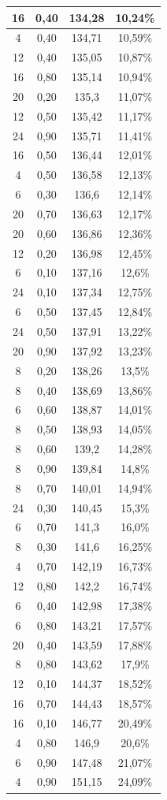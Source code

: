 \begin{center}
\begin{longtable}{|c|c|c|c|}
16 & 0,40 & 134,28 & 10,24\% \\ \hline
4 & 0,40 & 134,71 & 10,59\% \\ \hline
12 & 0,40 & 135,05 & 10,87\% \\ \hline
16 & 0,80 & 135,14 & 10,94\% \\ \hline
20 & 0,20 & 135,3 & 11,07\% \\ \hline
12 & 0,50 & 135,42 & 11,17\% \\ \hline
24 & 0,90 & 135,71 & 11,41\% \\ \hline
16 & 0,50 & 136,44 & 12,01\% \\ \hline
4 & 0,50 & 136,58 & 12,13\% \\ \hline
6 & 0,30 & 136,6 & 12,14\% \\ \hline
20 & 0,70 & 136,63 & 12,17\% \\ \hline
20 & 0,60 & 136,86 & 12,36\% \\ \hline
12 & 0,20 & 136,98 & 12,45\% \\ \hline
6 & 0,10 & 137,16 & 12,6\% \\ \hline
24 & 0,10 & 137,34 & 12,75\% \\ \hline
6 & 0,50 & 137,45 & 12,84\% \\ \hline
24 & 0,50 & 137,91 & 13,22\% \\ \hline
20 & 0,90 & 137,92 & 13,23\% \\ \hline
8 & 0,20 & 138,26 & 13,5\% \\ \hline
8 & 0,40 & 138,69 & 13,86\% \\ \hline
6 & 0,60 & 138,87 & 14,01\% \\ \hline
8 & 0,50 & 138,93 & 14,05\% \\ \hline
8 & 0,60 & 139,2 & 14,28\% \\ \hline
8 & 0,90 & 139,84 & 14,8\% \\ \hline
8 & 0,70 & 140,01 & 14,94\% \\ \hline
24 & 0,30 & 140,45 & 15,3\% \\ \hline
6 & 0,70 & 141,3 & 16,0\% \\ \hline
8 & 0,30 & 141,6 & 16,25\% \\ \hline
4 & 0,70 & 142,19 & 16,73\% \\ \hline
12 & 0,80 & 142,2 & 16,74\% \\ \hline
6 & 0,40 & 142,98 & 17,38\% \\ \hline
6 & 0,80 & 143,21 & 17,57\% \\ \hline
20 & 0,40 & 143,59 & 17,88\% \\ \hline
8 & 0,80 & 143,62 & 17,9\% \\ \hline
12 & 0,10 & 144,37 & 18,52\% \\ \hline
16 & 0,70 & 144,43 & 18,57\% \\ \hline
16 & 0,10 & 146,77 & 20,49\% \\ \hline
4 & 0,80 & 146,9 & 20,6\% \\ \hline
6 & 0,90 & 147,48 & 21,07\% \\ \hline
4 & 0,90 & 151,15 & 24,09\% \\ \hline
\end{longtable}
\label{table:historicalVolatilityAppendixTable}
\end{center}
\normalsize